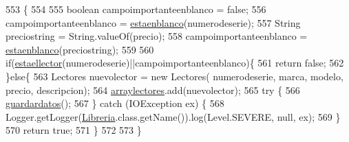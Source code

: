 \begin{DoxyCode}
553                                                                                                            
                           \{
554          
555          \textcolor{keywordtype}{boolean} campoimportanteenblanco = \textcolor{keyword}{false};
556              campoimportanteenblanco = \mbox{\hyperlink{classlibreria_1_1_libreria_afca98a0ea16507ff5cc9bc0dde706abb}{estaenblanco}}(numerodeserie);
557              String preciostring = String.valueOf(precio);
558              campoimportanteenblanco = \mbox{\hyperlink{classlibreria_1_1_libreria_afca98a0ea16507ff5cc9bc0dde706abb}{estaenblanco}}(preciostring);
559              
560             \textcolor{keywordflow}{if}(\mbox{\hyperlink{classlibreria_1_1_libreria_a1d272b2c2f64bbeaa6e24f4f8c5ba2e7}{estaellector}}(numerodeserie)||campoimportanteenblanco)\{
561                 \textcolor{keywordflow}{return} \textcolor{keyword}{false};
562             \}\textcolor{keywordflow}{else}\{
563                 Lectores nuevolector = \textcolor{keyword}{new} Lectores( numerodeserie, marca, modelo, precio, descripcion);
564                 \mbox{\hyperlink{classlibreria_1_1_libreria_ac9e002dcb370eb6caa314d18cf14a293}{arraylectores}}.add(nuevolector);
565              \textcolor{keywordflow}{try} \{
566                  \mbox{\hyperlink{classlibreria_1_1_libreria_abc10249e70e74a9ba55a081bbf23cfcd}{guardardatos}}();
567              \} \textcolor{keywordflow}{catch} (IOException ex) \{
568                  Logger.getLogger(\mbox{\hyperlink{classlibreria_1_1_libreria_a93220dd4de47ee3b7ef4b2a90701c253}{Libreria}}.class.getName()).log(Level.SEVERE, null, ex);
569              \}
570                 \textcolor{keywordflow}{return} \textcolor{keyword}{true};
571             \}
572          
573      \}
\end{DoxyCode}
\mbox{\label{classlibreria_1_1_libreria_aa5450eb41fd6d88d4a26514245729842}} 
